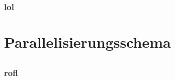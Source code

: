 \documentclass{beamer}
\begin{document}
\begin{frame}
    \frametitle{lol}

\end{frame}


\section{Parallelisierungsschema}
\subsection{}


\begin{frame}
    \frametitle{rofl}
\end{frame}

\end{document}
